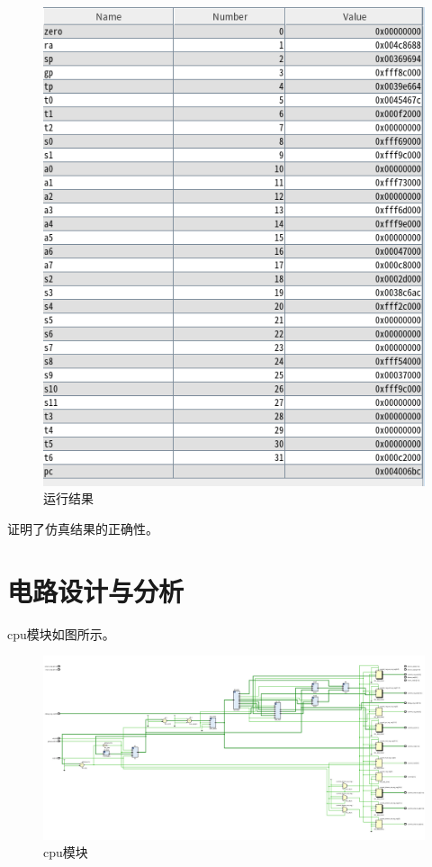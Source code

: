 \documentclass[12pt,a4paper]{ctexart}
\begin{document}
\begin{figure}[H]
    \centering
    \includegraphics[scale=1]{pic/4.png}
    \caption{运行结果}
\end{figure}
证明了仿真结果的正确性。
\section{电路设计与分析}
cpu模块如图所示。
\begin{figure}[H]
    \centering
    \includegraphics[scale=0.3]{pic/5.png}
    \caption{cpu模块}
\end{figure}
\end{document}

